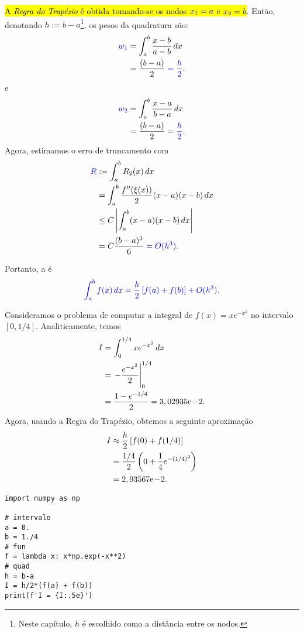\hl{A \emph{Regra do Trapézio} é obtida tomando-se os nodos $\color{blue}x_1=a$ e $\color{blue}x_2=b$}. Então, denotando $h:=b-a$\footnote{Neste capítulo, $h$ é escolhido como a distância entre os nodos.}, os pesos da quadratura são:
\begin{subequations}
  \begin{align}
    \color{blue}w_1 &= \int_a^b \frac{x-b}{a-b}\,dx \\
               &= \frac{(b-a)}{2} \color{blue}= \frac{h}{2}.
  \end{align}
\end{subequations}
e
\begin{subequations}
  \begin{align}
    \color{blue}w_2 &= \int_a^b \frac{x-a}{b-a}\,dx \\
        &= \frac{(b-a)}{2} \color{blue}= \frac{h}{2}.
  \end{align}
\end{subequations}
Agora, estimamos o erro de truncamento com
\begin{align}
  \color{blue}R &:= \int_a^b R_2(x)\,dx\\
  &= \int_a^b \frac{f''(\xi(x))}{2}(x-a)(x-b)\,dx\\
  &\leq C\left|\int_a^b (x-a)(x-b)\,dx\right|\\
  &= C\frac{(b-a)^3}{6} \color{blue}= O(h^3).
\end{align}

Portanto, a  é
\begin{equation}\color{blue}\int_a^b f(x)\,dx = \frac{h}{2}\left[f(a) + f(b)\right] + O(h^3).
\end{equation}

\begin{ex}\label{cap_integr_sec_nc:ex:int_trap}
  Consideramos o problema de computar a integral de $f(x)=xe^{-x^2}$ no intervalo $[0, 1/4]$. Analiticamente, temos
  \begin{subequations}
    \begin{align}
      I &= \int_0^{1/4} xe^{-x^2}\,dx\\
        &= \left. -\frac{e^{-x^2}}{2} \right|_0^{1/4}\\
        &= \frac{1-e^{-1/4}}{2} = 3,02935\mathrm{e}\!-\!2.
  \end{align}
\end{subequations}
Agora, usando a Regra do Trapézio, obtemos a seguinte aproximação
\begin{subequations}
  \begin{align}
    I &\approx \frac{h}{2}\left[f(0) + f(1/4)\right]\\
      &= \frac{1/4}{2}\left(0 + \frac{1}{4}e^{-(1/4)^2}\right)\\
      &= 2,93567\mathrm{e}\!-\!2.
  \end{align}
\end{subequations}

\begin{lstlisting}
import numpy as np

# intervalo
a = 0.
b = 1./4
# fun
f = lambda x: x*np.exp(-x**2)
# quad
h = b-a
I = h/2*(f(a) + f(b))
print(f'I = {I:.5e}')
\end{lstlisting}
\end{ex}

